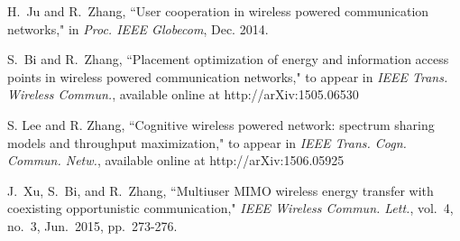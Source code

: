 \documentclass[journal, draftcls, one column, 12pt]{IEEEtran}
\begin{document}
\begin{thebibliography}{1}
H.~Ju and R.~Zhang, ``User cooperation in wireless powered communication networks," in \emph{Proc. IEEE Globecom}, Dec. 2014.

S.~Bi and R.~Zhang, ``Placement optimization of energy and information access points in wireless powered communication networks," to appear in \emph{IEEE Trans. Wireless Commun.}, available online at http://arXiv:1505.06530

S. Lee and R. Zhang, ``Cognitive wireless powered network: spectrum sharing models and throughput maximization," to appear in \emph{IEEE Trans. Cogn. Commun. Netw.}, available online at http://arXiv:1506.05925

J.~Xu, S.~Bi, and R.~Zhang, ``Multiuser MIMO wireless energy transfer with coexisting opportunistic communication," \emph{IEEE Wireless Commun. Lett.}, vol.~4, no.~3, Jun.~2015, pp.~273-276.
\end{thebibliography}
\end{document}
